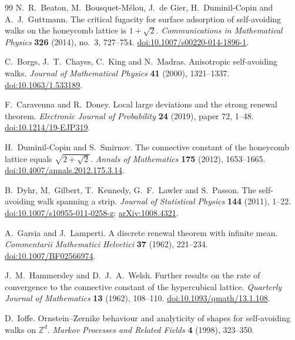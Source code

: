\begin{thebibliography}{99}
 N.~R.~Beaton, M.~Bousquet-M\'elou, J.~de Gier, H.~Duminil-Copin and A.~J.~Guttmann. The critical fugacity for surface adsorption of self-avoiding walks on the honeycomb lattice is $1+\sqrt2$. \emph{Communications in Mathematical Physics} \textbf{326} (2014), no.~3, 727--754. \href{https://doi.org/10.1007/s00220-014-1896-1}{doi:10.1007/s00220-014-1896-1}.

 C.~Borgs, J.~T.~Chayes, C.~King and N.~Madras. Anisotropic self-avoiding walks. \emph{Journal of Mathematical Physics} \textbf{41} (2000), 1321--1337. \href{https://doi.org/10.1063/1.533189}{doi:10.1063/1.533189}.

 F.~Caravenna and R.~Doney. Local large deviations and the strong renewal theorem. \emph{Electronic Journal of Probability} \textbf{24} (2019), paper 72, 1--48. \href{https://doi.org/10.1214/19-EJP319}{doi:10.1214/19-EJP319}.

 H.~Duminil-Copin and S.~Smirnov. The connective constant of the honeycomb lattice equals $\sqrt{2+\sqrt2}$. \emph{Annals of Mathematics} \textbf{175} (2012), 1653--1665. \href{https://doi.org/10.4007/annals.2012.175.3.14}{doi:10.4007/annals.2012.175.3.14}.

 B.~Dyhr, M.~Gilbert, T.~Kennedy, G.~F.~Lawler and S.~Passon. The self-avoiding walk spanning a strip. \emph{Journal of Statistical Physics} \textbf{144} (2011), 1--22. \href{https://doi.org/10.1007/s10955-011-0258-z}{doi:10.1007/s10955-011-0258-z}; \href{https://arxiv.org/abs/1008.4321}{arXiv:1008.4321}.

 A.~Garsia and J.~Lamperti. A discrete renewal theorem with infinite mean. \emph{Commentarii Mathematici Helvetici} \textbf{37} (1962), 221--234. \href{https://doi.org/10.1007/BF02566974}{doi:10.1007/BF02566974}.

 J.~M.~Hammersley and D.~J.~A.~Welsh. Further results on the rate of convergence to the connective constant of the hypercubical lattice. \emph{Quarterly Journal of Mathematics} \textbf{13} (1962), 108--110. \href{https://doi.org/10.1093/qmath/13.1.108}{doi:10.1093/qmath/13.1.108}.

 D.~Ioffe. Ornstein--Zernike behaviour and analyticity of shapes for self-avoiding walks on $\mathbb Z^d$. \emph{Markov Processes and Related Fields} \textbf{4} (1998), 323--350.


\end{thebibliography}
